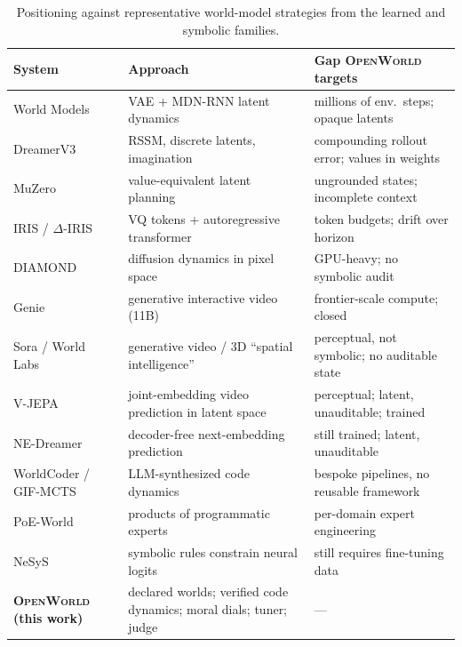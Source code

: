 \documentclass[11pt]{article}
\newcommand{\openworld}{\textsc{OpenWorld}}
\begin{document}
\begin{table}[htb]\centering\small
\begin{tabular}{L{3.4cm}L{4.1cm}L{4.1cm}}
\toprule
System & Approach & Gap \openworld{} targets \\
\midrule
World Models~\cite{ha2018world} & VAE + MDN-RNN latent dynamics & millions of env.\ steps; opaque latents \\
DreamerV3~\cite{dreamerv3} & RSSM, discrete latents, imagination & compounding rollout error; values in weights \\
MuZero~\cite{muzero} & value-equivalent latent planning & ungrounded states; incomplete context \\
IRIS / $\Delta$-IRIS~\cite{iris2023,deltairis2024} & VQ tokens + autoregressive transformer & token budgets; drift over horizon \\
DIAMOND~\cite{diamond2024} & diffusion dynamics in pixel space & GPU-heavy; no symbolic audit \\
Genie~\cite{genie2024} & generative interactive video (11B) & frontier-scale compute; closed \\
Sora / World Labs~\cite{sora2024,worldlabs2025} & generative video / 3D ``spatial intelligence'' & perceptual, not symbolic; no auditable state \\
V-JEPA~\cite{vjepa2025} & joint-embedding video prediction in latent space & perceptual; latent, unauditable; trained \\
NE-Dreamer~\cite{nedreamer2026} & decoder-free next-embedding prediction & still trained; latent, unauditable \\
WorldCoder / GIF-MCTS~\cite{worldcoder2024,gifmcts2024} & LLM-synthesized code dynamics & bespoke pipelines, no reusable framework \\
PoE-World~\cite{poeworld2025} & products of programmatic experts & per-domain expert engineering \\
NeSyS~\cite{nesys2026} & symbolic rules constrain neural logits & still requires fine-tuning data \\
\textbf{\openworld{} (this work)} & declared worlds; verified code dynamics; moral dials; tuner; judge & --- \\
\bottomrule
\end{tabular}
\caption{Positioning against representative world-model strategies from the
learned and symbolic families.}
\label{tab:related}
\end{table}

\end{document}
